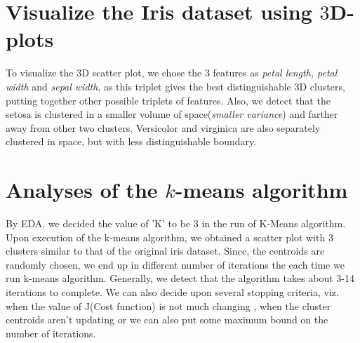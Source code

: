 \documentclass[a4paper, 12pt]{article}
\begin{document}
\section{Visualize the Iris dataset using $3$D-plots}
To visualize the 3D scatter plot, we chose the 3 features as \emph{petal length, petal width} and \emph{sepal width}, as this triplet gives the best distinguishable 3D clusters, putting together other possible triplets of features.  Also, we detect that the setosa is clustered in a smaller volume of space(\emph{smaller variance}) and farther away from other two clusters. Versicolor and virginica are also separately clustered in space, but with less distinguishable boundary.

\section{Analyses of the $k$-means algorithm}
 By EDA, we decided the value of 'K' to be 3 in the run of K-Means algorithm. Upon execution of the k-means algorithm, we obtained a scatter plot with 3 clusters similar to that of the original iris dataset. Since, the centroids are randomly chosen, we end up in different number of iterations the each time we run k-means algorithm. Generally, we detect that the algorithm takes about 3-14 iterations to complete. We can also decide upon several stopping criteria, viz. when the value of J(Cost function) is not much changing , when the cluster centroids aren't updating or we can also put some maximum bound on the number of iterations.
\end{document}
